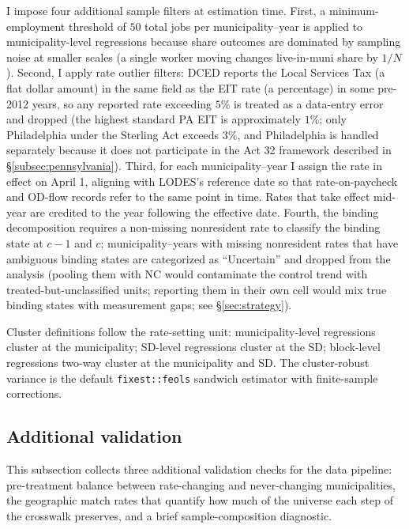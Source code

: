 \documentclass[12pt]{article}
\begin{document}
I impose four additional sample filters at estimation time. First,
a minimum-employment threshold of $50$ total jobs per municipality--year is
applied to municipality-level regressions because share outcomes are
dominated by sampling noise at smaller scales (a single worker
moving changes live-in-muni share by $1/N$).
Second, I apply rate outlier filters: DCED reports the Local
Services Tax (a flat dollar amount) in the same field as the EIT
rate (a percentage) in some pre-2012 years, so any reported rate
exceeding $5\%$ is treated as a data-entry error and dropped (the
highest standard PA EIT is approximately $1\%$; only Philadelphia
under the Sterling Act exceeds $3\%$, and Philadelphia is handled
separately because it does not participate in the Act 32 framework
described in \S\ref{subsec:pennsylvania}). Third, for each
municipality--year I assign the rate in effect on April 1, aligning with
LODES's reference date so that rate-on-paycheck and OD-flow records
refer to the same point in time. Rates that take effect mid-year
are credited to the year following the effective date. Fourth, the
binding decomposition requires a non-missing nonresident
rate to classify the binding state at $c-1$ and $c$; municipality--years
with missing nonresident rates that have ambiguous binding states
are categorized as ``Uncertain'' and dropped from the analysis
(pooling them with NC would contaminate the control trend with
treated-but-unclassified units; reporting them in their own cell
would mix true binding states with measurement gaps; see
\S\ref{sec:strategy}).

Cluster definitions follow the rate-setting unit: municipality-level
regressions cluster at the municipality; SD-level regressions cluster at
the SD; block-level regressions two-way cluster at the municipality and
SD. The cluster-robust variance is the default
\texttt{fixest::feols} sandwich estimator with finite-sample
corrections.

\subsection{Additional validation}
\label{app:data-balance}
\label{app:balance}

This subsection collects three additional validation checks for the
data pipeline: pre-treatment balance between rate-changing and
never-changing municipalities, the geographic match rates that quantify how
much of the universe each step of the crosswalk preserves, and a
brief sample-composition diagnostic.
\end{document}
